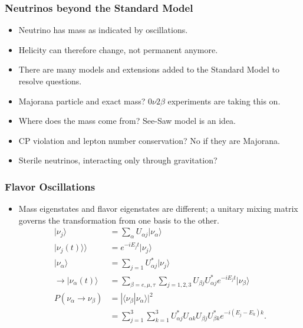 \documentclass[mathserif,18pt,xcolor=table]{beamer}
\begin{document}
\begin{frame}
  \frametitle{Neutrinos beyond the Standard Model}
  \begin{itemize}
  \item Neutrino has mass as indicated by oscillations.
  \item Helicity can therefore change, not permanent anymore.
  \item There are many models and extensions added to the Standard Model to resolve questions.
  \item Majorana particle and exact mass? $0\nu2\beta$ experiments are taking this on.
  \item Where does the mass come from? See-Saw model is an idea.
  \item CP violation and lepton number conservation? No if they are Majorana.
  \item Sterile neutrinos, interacting only through gravitation?
  \end{itemize}
\end{frame}

\begin{frame}
  \frametitle{Flavor Oscillations}
  \begin{itemize}
  \item Mass eigenstates and flavor eigenstates are different; a unitary mixing matrix governs the transformation from one basis to the other.
    \begin{align}
      |\nu_j\rangle &= \sum_\alpha U_{\alpha j}|\nu_\alpha\rangle \\
      |\nu_j(t)\rangle\rangle &= e^{-iE_j t}|\nu_j\rangle \\
      |\nu_\alpha\rangle &= \sum_{j=1}U^{*}_{\alpha j}|\nu_j\rangle \\
      \rightarrow |\nu_\alpha(t)\rangle &= \sum_{\beta=e,\mu,\tau}\sum_{j=1,2,3} U_{\beta j}U^*_{\alpha j}e^{-iE_jt}|\nu_\beta\rangle \\
      P(\nu_\alpha\rightarrow \nu_\beta) &= |\langle\nu_\beta|\nu_\alpha\rangle|^2 \\
      &= \sum_{j=1}^3\sum_{k=1}^3 U^*_{\alpha j}U_{\alpha k}U_{\beta j}U_{\beta k}^* e^{-i(E_j-E_k)k}.
    \end{align}
  \end{itemize}
\end{frame}
\end{document}
